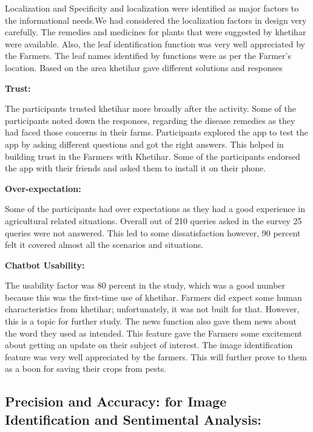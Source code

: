 \documentclass[10pt,conference]{IEEEtran}
\begin{document}
{\raggedright
Localization and Specificity and localization were identified as major factors to the informational needs.We had considered the localization factors in design very carefully. The remedies and medicines for plants that were suggested by khetihar were available. Also, the leaf identification function was very well appreciated by the Farmers. The leaf names identified by functions were as per the Farmer's location. Based on the area khetihar gave different solutions and responses
}



{\raggedright
\textbf{Trust: }
}

{\raggedright
The participants trusted khetihar more broadly after the activity. Some of the participants noted down the responses, regarding the disease remedies as they had faced those concerns in their farms. Participants explored the app to test the app by asking different questions and got the right answers. This helped in building trust in the Farmers with Khetihar. Some of the participants endorsed the app with their friends and asked them to install it on their phone. 
}

{\raggedright
\textbf{Over-expectation:}
}

{\raggedright
Some of the participants had over expectations as they had a good experience in agricultural related situations. Overall out of 210 queries asked in the survey 25 queries were not answered. This led to some dissatisfaction however, 90 percent felt it covered almost all the scenarios and situations.
}

{\raggedright
\textbf{Chatbot Usability:}
}

{\raggedright
The usability factor was 80 percent in the study, which was a good number because this was the first-time use of khetihar. Farmers did expect some human characteristics from khetihar; unfortunately, it was not built for that. However, this is a topic for further study. The news function also gave them news about the word they used as intended. This feature gave the Farmers some excitement about getting an update on their subject of interest. The image identification feature was very well appreciated by the farmers. This will further prove to them as a boon for saving their crops from pests.
}


	


\subsection{Precision and Accuracy: for Image Identification and Sentimental Analysis:}
\end{document}

